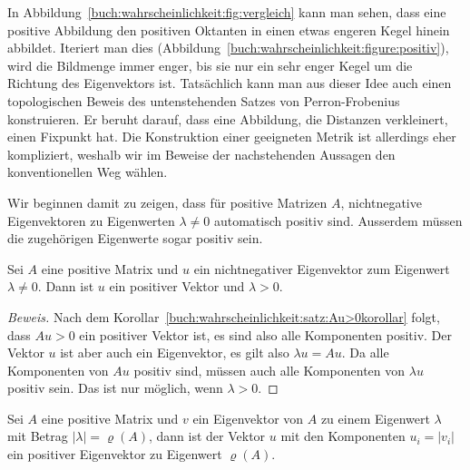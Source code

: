 In Abbildung~\ref{buch:wahrscheinlichkeit:fig:vergleich} kann man sehen,
dass eine positive Abbildung den positiven Oktanten in einen etwas engeren
Kegel hinein abbildet.
Iteriert man dies (Abbildung~\ref{buch:wahrscheinlichkeit:figure:positiv}),
wird die Bildmenge immer enger, bis sie nur ein
sehr enger Kegel um die Richtung des Eigenvektors ist.
Tatsächlich kann man aus dieser Idee auch einen topologischen
Beweis des untenstehenden Satzes von Perron-Frobenius konstruieren.
Er beruht darauf, dass eine Abbildung, die Distanzen verkleinert,
einen Fixpunkt hat.
Die Konstruktion einer geeigneten Metrik ist allerdings eher 
kompliziert, weshalb wir im Beweise der nachstehenden Aussagen
den konventionellen Weg wählen.

Wir beginnen damit zu zeigen, dass für positive Matrizen $A$, 
nichtnegative Eigenvektoren zu Eigenwerten $\lambda\ne 0$
automatisch positiv sind.
Ausserdem müssen die zugehörigen Eigenwerte sogar positiv sein.

\begin{satz}
Sei $A$ eine positive Matrix und $u$ ein nichtnegativer Eigenvektor zum
Eigenwert $\lambda\ne 0$.
Dann ist $u$ ein positiver Vektor und $\lambda > 0$.
\end{satz}

\begin{proof}[Beweis]
Nach dem Korollar~\ref{buch:wahrscheinlichkeit:satz:Au>0korollar}
folgt, dass $Au>0$ ein positiver Vektor ist, es sind
also alle Komponenten positiv.
Der Vektor $u$ ist aber auch ein Eigenvektor, es gilt also
$\lambda u = Au$.
Da alle Komponenten von $Au$ positiv sind, müssen auch
alle Komponenten von $\lambda u$ positiv sein.
Das ist nur möglich, wenn $\lambda > 0$.
\end{proof}

\begin{satz}
\label{buch:wahrscheinlichkeit:satz:positivereigenvektor}
Sei $A$ eine positive Matrix und $v$ ein Eigenvektor von $A$ zu einem
Eigenwert $\lambda$ mit Betrag $|\lambda|=\varrho(A)$,
dann ist der Vektor $u$  mit den Komponenten $u_i=|v_i|$ ein
positiver Eigenvektor zu Eigenwert $\varrho(A)$.
\end{satz}

